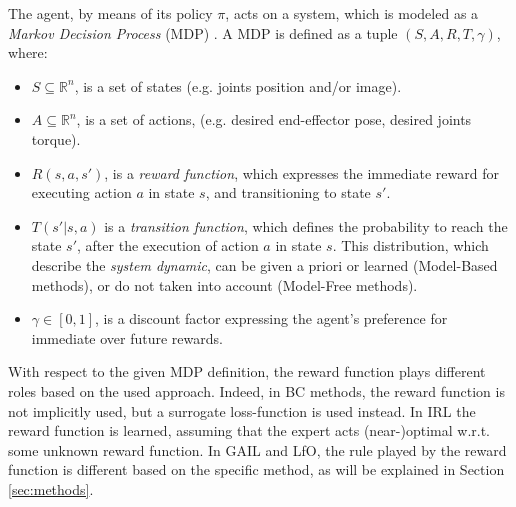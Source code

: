 \newline The agent, by means of its policy $\pi$, acts on a system, which is modeled as a \textit{Markov Decision Process} (MDP) \cite{kroemer2021review_robot_learning}. A MDP is defined as a tuple $(S,A,R,T,\gamma)$, where:
\begin{itemize}
    \item $S \subseteq \mathbb{R}^{n}$, is a set of states (e.g. joints position and/or image).
    \item $A \subseteq \mathbb{R}^{n}$, is a set of actions, (e.g. desired end-effector pose, desired joints torque).
    \item $R(s,a,s')$, is a \textit{reward function}, which expresses the immediate reward for executing action $a$ in state $s$, and transitioning to state $s'$.
    \item $T(s'|s,a)$ is a \textit{transition function}, which defines the probability to reach the state $s'$, after the execution of action $a$ in state $s$. This distribution, which describe the \textit{system dynamic}, can be given a priori or learned (Model-Based methods), or do not taken into account (Model-Free methods).
    \item $\gamma \in [0,1]$, is a discount factor expressing the agent's preference for immediate over future rewards.
\end{itemize}
With respect to the given MDP definition, the reward function plays different roles based on the used approach. Indeed, in BC methods, the reward function is not implicitly used, but a surrogate loss-function is used instead. In IRL the reward function is learned, assuming that the expert acts (near-)optimal w.r.t. some unknown reward function. In GAIL and LfO, the rule played by the reward function is different based on the specific method, as will be explained in Section \ref{sec:methods}.